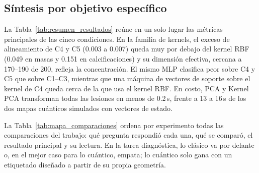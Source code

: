 
\subsection{Síntesis por objetivo específico}
\label{sec:sintesis_objetivos}

La Tabla~\ref{tab:resumen_resultados} reúne en un solo lugar las métricas principales de las cinco condiciones.
En la familia de kernels, el exceso de alineamiento de C4 y C5 (0.003 a 0.007) queda muy por debajo del kernel RBF
(0.049 en masas y 0.151 en calcificaciones) y su dimensión efectiva, cercana a 170--190 de 200, refleja la concentración.
El mismo MLP clasifica peor sobre C4 y C5 que sobre C1--C3, mientras que una máquina de vectores de soporte sobre
el kernel de C4 queda cerca de la que usa el kernel RBF. En costo, PCA y Kernel PCA transforman todas las lesiones
en menos de 0.2\,s, frente a 13 a 16\,s de los dos mapas cuánticos simulados con vectores de estado.



La Tabla~\ref{tab:mapa_comparaciones} ordena por experimento todas las comparaciones del trabajo: qué
pregunta respondió cada una, qué se comparó, el resultado principal y su lectura. En la tarea diagnóstica,
lo clásico va por delante o, en el mejor caso para lo cuántico, empata; lo cuántico solo gana con un
etiquetado diseñado a partir de su propia geometría.

